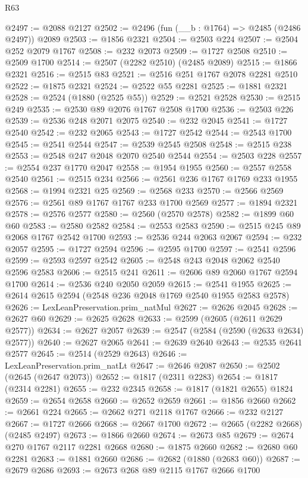 \begin{lexlean}{R63}
\begin{coremodule}
@2497 := @2088 @2127
@2502 := @2496 (fun (__b : @1764) => @2485 (@2486 @2497)) @2089
@2503 := @1856 @2321
@2504 := @2503 @224
@2507 := @2504 @252 @2079 @1767
@2508 := @232 @2073
@2509 := @1727 @2508
@2510 := @2509 @1700
@2514 := @2507 (@2282 @2510) (@2485 @2089)
@2515 := @1866 @2321
@2516 := @2515 @83
@2521 := @2516 @251 @1767 @2078 @2281 @2510
@2522 := @1875 @2321
@2524 := @2522 @55 @2281
@2525 := @1881 @2321
@2528 := @2524 (@1880 (@2525 @55))
@2529 := @2521 @2528
@2530 := @2515 @249
@2535 := @2530 @89 @2076 @1767 @2508 @1700
@2536 := @2503 @226
@2539 := @2536 @248 @2071 @2075
@2540 := @232 @2045
@2541 := @1727 @2540
@2542 := @232 @2065
@2543 := @1727 @2542
@2544 := @2543 @1700
@2545 := @2541 @2544
@2547 := @2539 @2545 @2508
@2548 := @2515 @238
@2553 := @2548 @247 @2048 @2070 @2540 @2544
@2554 := @2503 @228
@2557 := @2554 @237 @1770 @2047
@2558 := @1954 @1955
@2560 := @2557 @2558 @2540
@2561 := @2515 @234
@2566 := @2561 @236 @1767 @1769 @233 @1955
@2568 := @1994 @2321 @25
@2569 := @2568 @233
@2570 := @2566 @2569
@2576 := @2561 @89 @1767 @1767 @233 @1700 @2569
@2577 := @1894 @2321
@2578 := @2576 @2577
@2580 := @2560 (@2570 @2578)
@2582 := @1899 @60 @60
@2583 := @2580 @2582
@2584 := @2553 @2583
@2590 := @2515 @245 @89 @2068 @1767 @2542 @1700
@2593 := @2536 @244 @2063 @2067
@2594 := @232 @2057
@2595 := @1727 @2594
@2596 := @2595 @1700
@2597 := @2541 @2596
@2599 := @2593 @2597 @2542
@2605 := @2548 @243 @2048 @2062 @2540 @2596 @2583
@2606 := @2515 @241
@2611 := @2606 @89 @2060 @1767 @2594 @1700
@2614 := @2536 @240 @2050 @2059
@2615 := @2541 @1955
@2625 := @2614 @2615 @2594 (@2548 @236 @2048 @1769 @2540 @1955 @2583 @2578)
@2626 := LexLeanPreservation.prim_natMul
@2627 := @2626 @2045
@2628 := @2627 @60
@2629 := @2625 @2628
@2633 := @2599 (@2605 (@2611 @2629 @2577))
@2634 := @2627 @2057
@2639 := @2547 (@2584 (@2590 (@2633 @2634) @2577))
@2640 := @2627 @2065
@2641 := @2639 @2640
@2643 := @2535 @2641 @2577
@2645 := @2514 (@2529 @2643)
@2646 := LexLeanPreservation.prim_natLt
@2647 := @2646 @2087
@2650 := @2502 (@2645 (@2647 @2073))
@2652 := @1817 (@2311 @2283)
@2654 := @1817 (@2314 @2281)
@2655 := @232 @2345
@2658 := @1817 (@1821 @2655) @1824
@2659 := @2654 @2658
@2660 := @2652 @2659
@2661 := @1856 @2660
@2662 := @2661 @224
@2665 := @2662 @271 @2118 @1767
@2666 := @232 @2127
@2667 := @1727 @2666
@2668 := @2667 @1700
@2672 := @2665 (@2282 @2668) (@2485 @2497)
@2673 := @1866 @2660
@2674 := @2673 @85
@2679 := @2674 @270 @1767 @2117 @2281 @2668
@2680 := @1875 @2660
@2682 := @2680 @60 @2281
@2683 := @1881 @2660
@2686 := @2682 (@1880 (@2683 @60))
@2687 := @2679 @2686
@2693 := @2673 @268 @89 @2115 @1767 @2666 @1700

\end{coremodule}
\end{lexlean}
